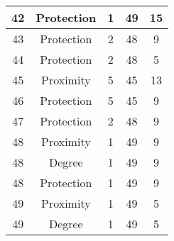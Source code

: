 \documentclass[results.tex]{subfiles}
\begin{document}
\begin{center}
\begin{tabular}{| c || c | c | c | c |}
            \hline
            42                      & Protection                   & 1                      & 49                      & 15                   \\
            \hline
            43                      & Protection                   & 2                      & 48                      & 9                    \\
            \hline
            44                      & Protection                   & 2                      & 48                      & 5                    \\
            \hline
            45                      & Proximity                    & 5                      & 45                      & 13                   \\
            \hline
            46                      & Protection                   & 5                      & 45                      & 9                    \\
            \hline
            47                      & Protection                   & 2                      & 48                      & 9                    \\
            \hline
            48                      & Proximity                    & 1                      & 49                      & 9                    \\
            \hline
            48                      & Degree                       & 1                      & 49                      & 9                    \\
            \hline
            48                      & Protection                   & 1                      & 49                      & 9                    \\
            \hline
            49                      & Proximity                    & 1                      & 49                      & 5                    \\
            \hline
            49                      & Degree                       & 1                      & 49                      & 5                    \\
            \hline
        \end{tabular}
    \end{center}
\end{document}
